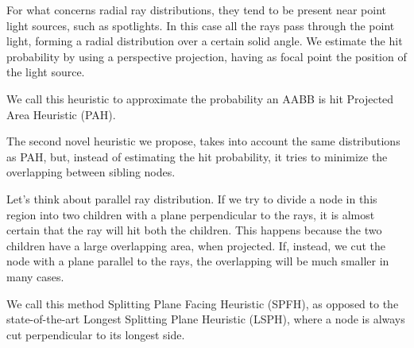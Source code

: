 \documentclass{PoliMi_MasterThesis}
\begin{document}
For what concerns radial ray distributions, they tend to be present near point light sources, such as spotlights. In this case all the rays pass through the point light, forming a radial distribution over a certain solid angle. We estimate the hit probability by using a perspective projection, having as focal point the position of the light source.

We call this heuristic to approximate the probability an AABB is hit Projected Area Heuristic (PAH).

The second novel heuristic we propose, takes into account the same distributions as PAH, but, instead of estimating the hit probability, it tries to minimize the overlapping between sibling nodes.

Let's think about parallel ray distribution. If we try to divide a node in this region into two children with a plane perpendicular to the rays, it is almost certain that the ray will hit both the children. This happens because the two children have a large overlapping area, when projected. If, instead, we cut the node with a plane parallel to the rays, the overlapping will be much smaller in many cases.

We call this method Splitting Plane Facing Heuristic (SPFH), as opposed to the state-of-the-art Longest Splitting Plane Heuristic (LSPH), where a node is always cut perpendicular to its longest side.
\end{document}
